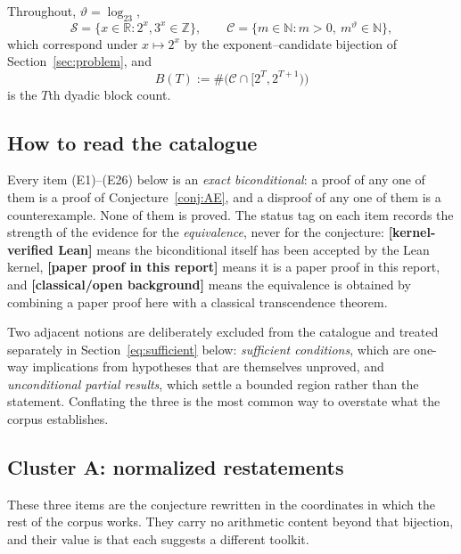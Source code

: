 \documentclass[11pt,oneside]{article}
\theoremstyle{definition}
\theoremstyle{remark}
\newcommand{\N}{\mathbb N}
\newcommand{\Z}{\mathbb Z}
\newcommand{\R}{\mathbb R}
\newcommand{\thetaq}{\vartheta}
\newcommand{\Sol}{\mathcal S}
\newcommand{\Cand}{\mathcal C}
\newcommand{\statuslean}{\textcolor{leanblue}{\textbf{[kernel-verified Lean]}}}
\newcommand{\statusnew}{\textcolor{newgreen}{\textbf{[paper proof in this report]}}}
\newcommand{\statusknown}{\textcolor{classicalgray}{\textbf{[classical/\allowbreak open background]}}}
\begin{document}
Throughout, $\thetaq=\log_23$,
\[
 \Sol=\{x\in\R:2^x,3^x\in\Z\},
 \qquad
 \Cand=\{m\in\N:m>0,\ m^{\thetaq}\in\N\},
\]
which correspond under $x\mapsto2^x$ by the exponent--candidate bijection of
Section~\ref{sec:problem}, and
\[
 B(T):=\#\bigl(\Cand\cap[2^T,2^{T+1})\bigr)
\]
is the $T$th dyadic block count.

\subsection{How to read the catalogue}

Every item (E1)--(E26) below is an \emph{exact biconditional}: a proof of any one of them is a
proof of Conjecture~\ref{conj:AE}, and a disproof of any one of them is a counterexample.
None of them is proved.  The status tag on each item records the strength of the evidence for
the \emph{equivalence}, never for the conjecture: \statuslean{} means the biconditional itself
has been accepted by the Lean kernel, \statusnew{} means it is a paper proof in this report,
and \statusknown{} means the equivalence is obtained by combining a paper proof here with a
classical transcendence theorem.

Two adjacent notions are deliberately excluded from the catalogue and treated separately in
Section~\ref{eq:sufficient} below: \emph{sufficient conditions}, which are one-way
implications from hypotheses that are themselves unproved, and \emph{unconditional partial
results}, which settle a bounded region rather than the statement.  Conflating the three is
the most common way to overstate what the corpus establishes.

\subsection{Cluster A: normalized restatements}

These three items are the conjecture rewritten in the coordinates in which the rest of the
corpus works.  They carry no arithmetic content beyond that bijection, and their value is that
each suggests a different toolkit.
\end{document}
